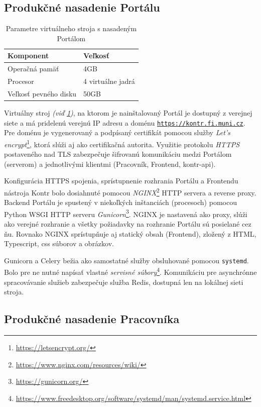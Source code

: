 \documentclass[
  digital, %
  oneside, %
  table,   %
  lof,     %
  lot,   %
]{fithesis3}
\newcommand*{\footurl}[1]{\footnote{\url{#1}}}
\begin{document}
\subsection{Produkčné nasadenie Portálu}

\begin{table}[h]
\begin{tabular}{l l}
Komponent & Veľkosť \\ [0.5ex] 
\hline
Operačná pamäť & 4GB  \\
Procesor & 4 virtuálne jadrá  \\
Veľkosť pevného disku&  50GB \\
\end{tabular}

\caption{Parametre virtuálneho stroja s nasadeným Portálom} \label{tab:machine-portal}

\end{table}

Virtuálny stroj \emph{(viď \ref{tab:machine-portal})}, na ktorom je nainštalovaný Portál je dostupný z verejnej siete a má pridelenú verejnú IP adresu a doménu \texttt{\url{https://kontr.fi.muni.cz}}. Pre doménu je vygenerovaný a podpísaný certifikát pomocou služby \emph{Let's encrypt}\footnote{\url{https://letsencrypt.org/}}, ktorá slúži aj ako certifikačná autorita. Využitie protokolu \emph{HTTPS}\cite{RFC2818} postaveného nad TLS\cite{RFC8446} zabezpečuje šifrovanú komunikáciu medzi Portálom (serverom) a jednotlivými klientmi (Pracovník, Frontend, kontr-api).

Konfigurácia HTTPS spojenia, sprístupnenie rozhrania Portálu a Frontendu nástroja Kontr bolo dosiahnuté pomocou \textit{NGINX}\footnote{\url{https://www.nginx.com/resources/wiki/}} HTTP servera a reverse proxy. Backend Portálu je spustený v niekoľkých inštanciách (procesoch) pomocou Python WSGI HTTP serveru \emph{Gunicorn}\footurl{https://gunicorn.org/}. NGINX je nastavená ako proxy, slúži ako verejné rozhranie a všetky požiadavky na rozhranie Portálu sú posielané cez ňu. Rovnako NGINX sprístupňuje aj statický obsah (Frontend), zložený z HTML, Typescript, css súborov a obrázkov.

Gunicorn a Celery bežia ako samostatné služby obsluhované pomocou \texttt{systemd}. Bolo pre ne nutné napísať vlastné \emph{servisné súbory}\footnote{\url{https://www.freedesktop.org/software/systemd/man/systemd.service.html}}. Komunikáciu pre asynchrónne spracovávanie služieb zabezpečuje služba Redis, dostupná len na lokálnej sieti stroja.

\subsection{Produkčné nasadenie Pracovníka}
\end{document}
